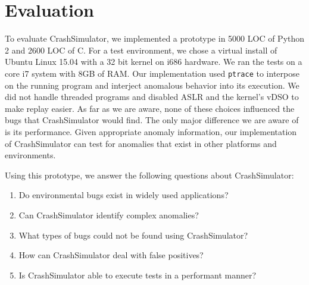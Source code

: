 \section{Evaluation}


To evaluate CrashSimulator, we implemented a prototype in 5000 LOC of Python 2
and 2600 LOC of C.  For a test
environment, we chose a virtual install of Ubuntu Linux 15.04 with a 32 bit kernel on i686 hardware.
We ran the tests on a core i7 system with 8GB of RAM. Our
implementation used {\tt ptrace} to interpose on the running program and
interject anomalous behavior into its execution.
We did not handle threaded programs and disabled ASLR and the kernel's vDSO to make replay
easier.  As far as we are aware, none of these choices influenced the bugs
that CrashSimulator would find.  The only major difference we are aware of 
is its performance.
Given appropriate anomaly information, our implementation of CrashSimulator can
test for anomalies that exist in other platforms and environments.  


Using this prototype, we answer the following questions about CrashSimulator:

\begin{enumerate}
   \item{Do environmental bugs exist in widely used applications?}
   \item{Can CrashSimulator identify complex anomalies?}
   \item{What types of bugs could not be found using CrashSimulator?}
   \item{How can CrashSimulator deal with false positives?}
   \item{Is CrashSimulator able to execute tests in a performant manner?}
\end{enumerate}





